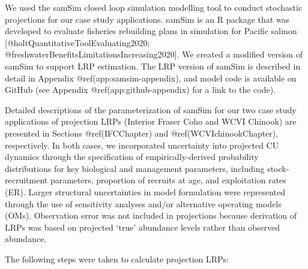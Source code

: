 \documentclass[
]{article}
\begin{document}
We used the samSim closed loop simulation modelling tool to conduct
stochastic projections for our case study applications. samSim is an R
package that was developed to evaluate fisheries rebuilding plans in
simulation for Pacific salmon {[}@holtQuantitativeToolEvaluating2020;
@freshwaterBenefitsLimitationsIncreasing2020{]}. We created a modified
version of samSim to support LRP estimation. The LRP version of samSim
is described in detail in Appendix @ref(app:samsim-appendix), and model
code is available on GitHub (see Appendix @ref(app:github-appendix) for
a link to the code).

Detailed descriptions of the parameterization of samSim for our two case
study applications of projection LRPs (Interior Fraser Coho and WCVI
Chinook) are presented in Sections @ref(IFCChapter) and
@ref(WCVIchinookChapter), respectively. In both cases, we incorporated
uncertainty into projected CU dynamics through the specification of
empirically-derived probability distributions for key biological and
management parameters, including stock-recruitment parameters,
proportion of recruits at age, and exploitation rates (ER). Larger
structural uncertainties in model formulation were represented through
the use of sensitivity analyses and/or alternative operating models
(OMs). Observation error was not included in projections because
derivation of LRPs was based on projected `true' abundance levels rather
than observed abundance.

The following steps were taken to calculate projection LRPs:
\end{document}

